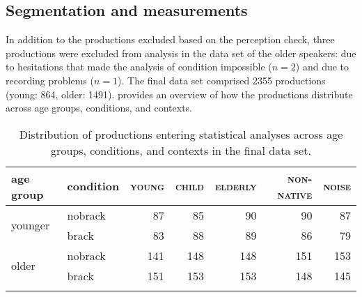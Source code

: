 \documentclass[output=paper]{langscibook}
\begin{document}
\subsection{Segmentation and measurements}\largerpage
In addition to the productions excluded based on the perception check, three productions were excluded from analysis in the data set of the older speakers: due to hesitations that made the analysis of condition impossible ($n=2$) and due to recording problems ($n=1$). The final data set comprised 2355 productions (young: 864, older: 1491).  provides an overview of how the productions distribute across age groups, conditions, and contexts.

\begin{table}%
\caption{Distribution of productions entering statistical analyses across age groups, conditions, and contexts in the final data set.}
\label{tab.distribution data set}
 \begin{tabular}{ll rrrrr}
  \lsptoprule
        age group & condition   & \textsc{young} & \textsc{child}  & \textsc{elderly} & \textsc{non-native} & \textsc{noise}\\
  \midrule
  \multirow{2}{*}{younger} & nobrack  &   87  &    85  &    90 & 90      & 87\\
   & brack  &   83 &   88  &    89 & 86    & 79\\
  \midrule
  \multirow{2}{*}{older} & nobrack & 141  &  148 & 148  &  151 & 153 \\
   & brack & 151  & 153  &  153 &  148 &  145\\
  \lspbottomrule
 \end{tabular}
\end{table}
\end{document}
